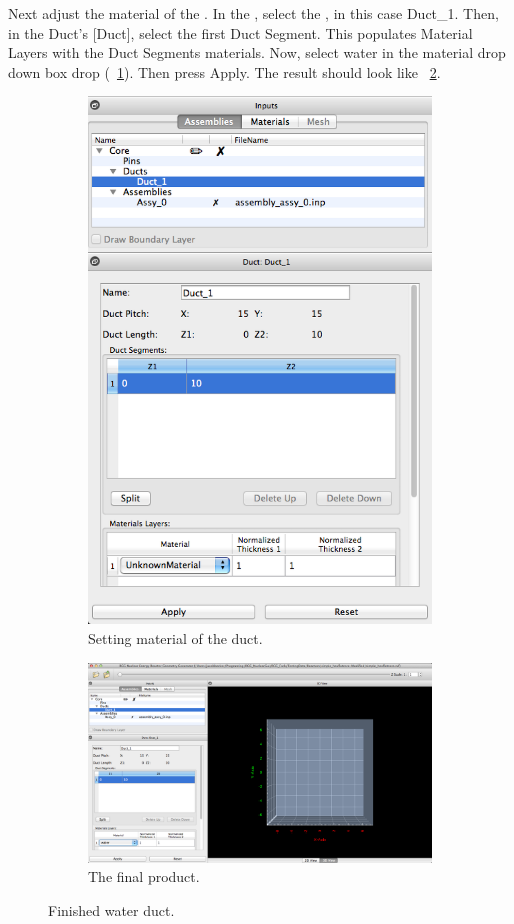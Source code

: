 Next adjust the material of the .  In the , select the , in this case Duct\_1.  Then, in the Duct's [Duct], select the first Duct Segment.  This populates Material Layers with the Duct Segments materials.  Now, select water in the material drop down box drop (~\ref{fig:rectSetMaterial}).  Then press Apply.  The result should look like ~\ref{fig:rectDuctResult}.

\begin{figure}
\centering
\begin{subfigure}{.4\textwidth}
  \centering
  \includegraphics[width=0.5\linewidth]{Images/rect-set-material.png}
  \caption{Setting material of the duct.}
  \label{fig:rectSetMaterial}
\end{subfigure}%
\begin{subfigure}{.6\textwidth}
  \centering
  \includegraphics[width=1.0\linewidth]{Images/rect-duct-result.png}
  \caption{The final product.}
  \label{fig:rectDuctResult}
\end{subfigure}
\caption{Finished water duct.}
\label{fig:test}
\end{figure}

